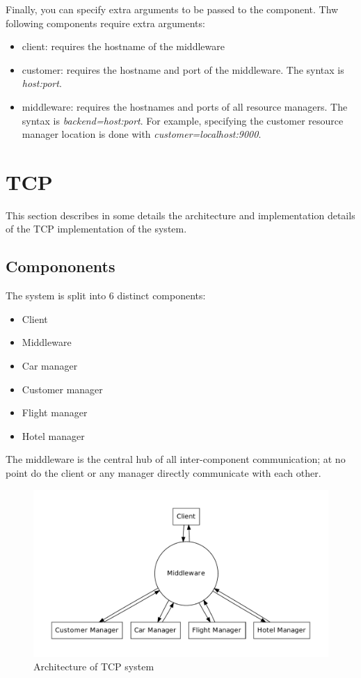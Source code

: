 \documentclass[11pt]{article}
\begin{document}
Finally, you can specify extra arguments to be passed to the
component.  Thw following components require extra arguments:

\begin{itemize}
\item client: requires the hostname of the middleware
\item customer: requires the hostname and port of the middleware.  The
  syntax is {\it host:port}.
\item middleware: requires the hostnames and ports of all resource
  managers.  The syntax is {\it backend=host:port}.  For example,
  specifying the customer resource manager location is done with {\it
    customer=localhost:9000}.
\end{itemize}




\section{TCP}

This section describes in some details the architecture and
implementation details of the TCP implementation of the system.


\subsection{Compononents}

The system is split into 6 distinct components:

\begin{itemize}
\item Client
\item Middleware
\item Car manager
\item Customer manager
\item Flight manager
\item Hotel manager
\end{itemize}

The middleware is the central hub of all inter-component
communication; at no point do the client or any manager directly
communicate with each other.


\begin{figure}[h]
  \begin{center}
    \label{fig:tcp}
    \caption{Architecture of TCP system}
    \includegraphics[scale=0.4]{tcp-diagram.pdf}
  \end{center}
\end{figure}
\end{document}
